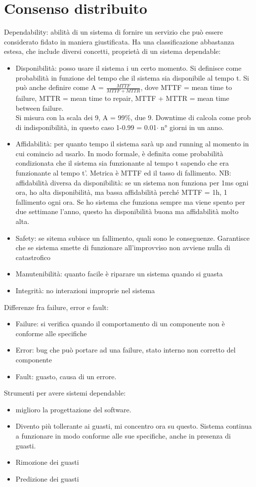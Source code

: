 \documentclass{article}
\begin{document}
\section{Consenso distribuito}
Dependability: abilità di un sistema di fornire un servizio che può essere considerato fidato in maniera giustificata. Ha una classificazione abbastanza estesa, che include diversi concetti, proprietà di un sistema dependable:
\begin{itemize}
\item Disponibilità: posso usare il sistema i un certo momento. Si definisce come probabilità in funzione del tempo che il sistema sia disponibile al tempo t. Si può anche definire come A = $\frac{MTTF}{MTTF + MTTR}$, dove MTTF = mean time to failure, MTTR = mean time to repair, MTTF + MTTR = mean time between failure.\\ Si misura con la scala dei 9, A = 99\%, due 9. Downtime di calcola come prob di indisponibilità, in questo caso 1-0.99 = 0.01$\cdot$ n° giorni in un anno.
\item Affidabilità: per quanto tempo il sistema sarà up and running al momento in cui comincio ad usarlo. In modo formale, è definita come probabilità condizionata che il sistema sia funzionante al tempo t sapendo che era funzionante al tempo t'. Metrica è MTTF ed il tasso di fallimento. NB: affidabilità diversa da disponibilità: se un sistema non funziona per 1ms ogni ora, ho alta disponibilità, ma bassa affidabilità perché MTTF = 1h, 1 fallimento ogni ora. Se ho sistema che funziona sempre ma viene spento per due settimane l'anno, questo ha disponibilità buona ma affidabilità molto alta.
\item Safety: se sitema subisce un fallimento, quali sono le conseguenze. Garantisce che se sistema smette di funzionare all'improvviso non avviene nulla di catastrofico
\item Manutenibilità: 	quanto facile è riparare un sistema quando si guasta
\item Integrità: no interazioni improprie nel sistema
\end{itemize}
Differenze fra failure, error e fault:
\begin{itemize}
\item Failure: si verifica quando il comportamento di un componente non è conforme alle specifiche
\item Error: bug che può portare ad una failure, stato interno non corretto del componente 
\item Fault: guasto, causa di un errore.
\end{itemize}
Strumenti per avere sistemi dependable: 
\begin{itemize}
\item miglioro la progettazione del software.
\item Divento più tollerante ai guasti, mi concentro ora su questo. Sistema continua a funzionare in modo conforme alle sue specifiche, anche in presenza di guasti.
\item Rimozione dei guasti
\item Predizione dei guasti
\end{itemize}
\end{document}
